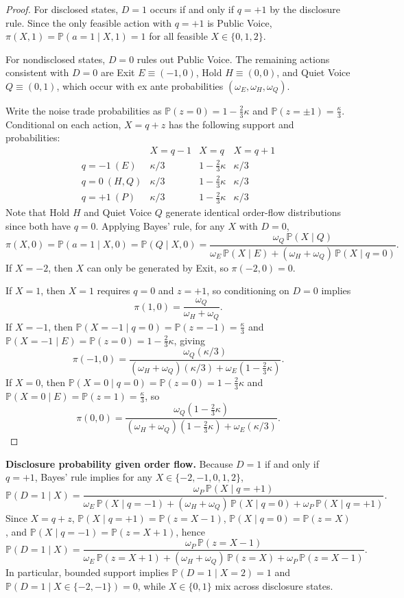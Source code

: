 \documentclass[11pt]{article}
\newcommand{\PP}{\mathbb{P}}
\newcommand{\1}{\mathbf{1}}
\begin{document}
\begin{proof}
For disclosed states, $D=1$ occurs if and only if $q=+1$ by the disclosure rule. Since the only feasible action with $q=+1$ is Public Voice, $\pi(X,1)=\PP(a=1 \mid X,1)=1$ for all feasible $X\in\{0,1,2\}$.

For nondisclosed states, $D=0$ rules out Public Voice. The remaining actions consistent with $D=0$ are Exit $E\equiv(-1,0)$, Hold $H\equiv(0,0)$, and Quiet Voice $Q\equiv(0,1)$, which occur with ex ante probabilities $(\omega_E,\omega_H,\omega_Q)$.

Write the noise trade probabilities as $\PP(z=0)=1-\frac{2}{3}\kappa$ and $\PP(z=\pm1)=\frac{\kappa}{3}$. Conditional on each action, $X=q+z$ has the following support and probabilities:
\[
\begin{array}{c|ccc}
 & X=q-1 & X=q & X=q+1 \\ \hline
q=-1~(E) & \kappa/3 & 1-\frac{2}{3}\kappa & \kappa/3 \\
q=0~(H,Q)  & \kappa/3 & 1-\frac{2}{3}\kappa & \kappa/3 \\
q=+1~(P) & \kappa/3 & 1-\frac{2}{3}\kappa & \kappa/3
\end{array}
\]
Note that Hold $H$ and Quiet Voice $Q$ generate identical order-flow distributions since both have $q=0$. Applying Bayes' rule, for any $X$ with $D=0$,
\[
\pi(X,0)=\PP(a=1 \mid X,0)=\PP(Q \mid X,0)=\frac{\omega_Q\,\PP(X \mid Q)}{\omega_E\,\PP(X \mid E)+(\omega_H+\omega_Q)\,\PP(X \mid q\!=\!0)}.
\]
If $X=-2$, then $X$ can only be generated by Exit, so $\pi(-2,0)=0$.

If $X=1$, then $X=1$ requires $q=0$ and $z=+1$, so conditioning on $D=0$ implies
\[
\pi(1,0)=\frac{\omega_Q}{\omega_H+\omega_Q}.
\]
If $X=-1$, then $\PP(X=-1 \mid q\!=\!0)=\PP(z=-1)=\frac{\kappa}{3}$ and $\PP(X=-1 \mid E)=\PP(z=0)=1-\frac{2}{3}\kappa$, giving
\[
\pi(-1,0)=\frac{\omega_Q(\kappa/3)}{(\omega_H+\omega_Q)(\kappa/3)+\omega_E(1-\frac{2}{3}\kappa)}.
\]
If $X=0$, then $\PP(X=0 \mid q\!=\!0)=\PP(z=0)=1-\frac{2}{3}\kappa$ and $\PP(X=0 \mid E)=\PP(z=1)=\frac{\kappa}{3}$, so
\[
\pi(0,0)=\frac{\omega_Q(1-\frac{2}{3}\kappa)}{(\omega_H+\omega_Q)(1-\frac{2}{3}\kappa)+\omega_E(\kappa/3)}.
\]
\end{proof}

\medskip\noindent\textbf{Disclosure probability given order flow.}
Because $D=1$ if and only if $q=+1$, Bayes' rule implies for any $X\in\{-2,-1,0,1,2\}$,
\[
\PP(D=1\mid X)
=\frac{\omega_P\,\PP(X\mid q=+1)}{\omega_E\,\PP(X\mid q=-1)+(\omega_H+\omega_Q)\,\PP(X\mid q=0)+\omega_P\,\PP(X\mid q=+1)}.
\]
Since $X=q+z$, $\PP(X\mid q=+1)=\PP(z=X-1)$, $\PP(X\mid q=0)=\PP(z=X)$, and $\PP(X\mid q=-1)=\PP(z=X+1)$, hence
\[
\PP(D=1\mid X)
=\frac{\omega_P\,\PP(z=X-1)}{\omega_E\,\PP(z=X+1)+(\omega_H+\omega_Q)\,\PP(z=X)+\omega_P\,\PP(z=X-1)}.
\]
In particular, bounded support implies $\PP(D=1\mid X=2)=1$ and $\PP(D=1\mid X\in\{-2,-1\})=0$, while $X\in\{0,1\}$ mix across disclosure states.
\end{document}
